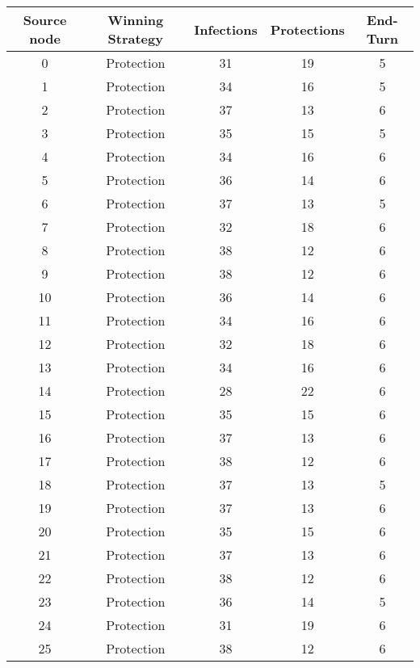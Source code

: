 \documentclass[results.tex]{subfiles}
\begin{document}
\begin{center}
  \begin{tabular}{| c || c | c | c | c |}
    \hline
    {\bfseries Source node} & {\bfseries Winning Strategy} & {\bfseries Infections} & {\bfseries Protections} & {\bfseries End-Turn} \\  %
    \hline\hline
    0 & Protection & 31 & 19 & 5 \\ 
    \hline
    1 & Protection & 34 & 16 & 5 \\ 
    \hline
    2 & Protection & 37 & 13 & 6 \\ 
    \hline
    3 & Protection & 35 & 15 & 5 \\ 
    \hline
    4 & Protection & 34 & 16 & 6 \\ 
    \hline
    5 & Protection & 36 & 14 & 6 \\ 
    \hline
    6 & Protection & 37 & 13 & 5 \\ 
    \hline
    7 & Protection & 32 & 18 & 6 \\ 
    \hline
    8 & Protection & 38 & 12 & 6 \\ 
    \hline
    9 & Protection & 38 & 12 & 6 \\ 
    \hline
    10 & Protection & 36 & 14 & 6 \\ 
    \hline
    11 & Protection & 34 & 16 & 6 \\ 
    \hline
    12 & Protection & 32 & 18 & 6 \\ 
    \hline
    13 & Protection & 34 & 16 & 6 \\ 
    \hline
    14 & Protection & 28 & 22 & 6 \\ 
    \hline
    15 & Protection & 35 & 15 & 6 \\ 
    \hline
    16 & Protection & 37 & 13 & 6 \\ 
    \hline
    17 & Protection & 38 & 12 & 6 \\ 
    \hline
    18 & Protection & 37 & 13 & 5 \\ 
    \hline
    19 & Protection & 37 & 13 & 6 \\ 
    \hline
    20 & Protection & 35 & 15 & 6 \\ 
    \hline
    21 & Protection & 37 & 13 & 6 \\ 
    \hline
    22 & Protection & 38 & 12 & 6 \\ 
    \hline
    23 & Protection & 36 & 14 & 5 \\ 
    \hline
    24 & Protection & 31 & 19 & 6 \\ 
    \hline
    25 & Protection & 38 & 12 & 6 \\ 

\end{tabular}
\end{center}
\end{document}
